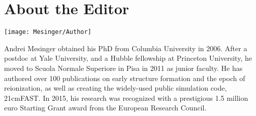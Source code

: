 \chapter*{About the Editor}


\texttt{[image: Mesinger/Author]}

Andrei Mesinger obtained his PhD from Columbia University in 2006.  After a postdoc at Yale University, and a Hubble fellowship at Princeton University, he moved to Scuola Normale Superiore in Pisa in 2011 as junior faculty.  He has authored over 100 publications on early structure formation and the epoch of reionization, as well as creating the widely-used public simulation code, 21cmFAST.  In 2015, his research was recognized with a prestigious 1.5 million euro Starting Grant award from the European Research Council.
